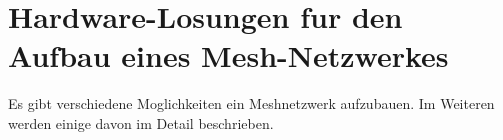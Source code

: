 \section{Hardware-Losungen fur den Aufbau eines Mesh-Netzwerkes}


Es gibt verschiedene Moglichkeiten ein Meshnetzwerk aufzubauen. Im Weiteren werden einige davon im Detail beschrieben. 




